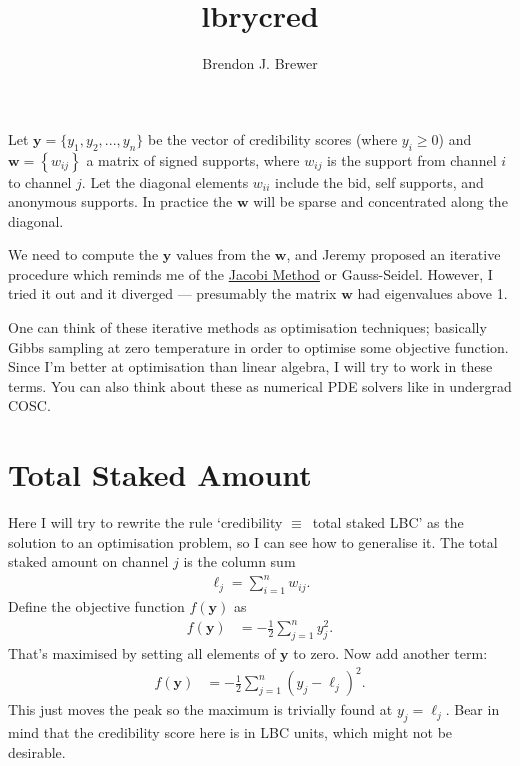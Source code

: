 \documentclass[a4paper, 12pt]{article}
\title{lbrycred}
\author{Brendon J. Brewer}
\date{}
\begin{document}
\maketitle


\setlength{\parindent}{0pt}
\setlength{\parskip}{8pt}

Let $\boldsymbol{y} = \{y_1, y_2, ..., y_n\}$ be the vector of credibility
scores (where $y_i \geq 0$) and $\boldsymbol{w} = \left\{w_{ij}\right\}$
a matrix of signed supports, where
$w_{ij}$ is the support from channel $i$ to channel $j$. Let the diagonal
elements $w_{ii}$ include the bid, self supports, and anonymous supports.
In practice the $\boldsymbol{w}$ will be sparse and concentrated along the
diagonal.

We need to compute the $\boldsymbol{y}$ values from the $\boldsymbol{w}$,
and Jeremy proposed an iterative procedure which reminds me of the
\href{https://en.wikipedia.org/wiki/Jacobi_method}{Jacobi Method} or
Gauss-Seidel. However,
I tried it out and it diverged --- presumably the matrix $\boldsymbol{w}$ had
eigenvalues above 1.

One can think of these iterative methods as optimisation techniques; basically
Gibbs sampling at zero temperature in order to optimise some objective
function. Since I'm better at optimisation than linear algebra, I will try to work in these terms. You can also think about these as numerical PDE solvers
like in undergrad COSC.

\section{Total Staked Amount}
Here I will try to rewrite the rule `credibility $\equiv$~total staked LBC'
as the solution to an optimisation problem, so I can see how to generalise it.
The total staked amount on channel $j$ is the column sum
\begin{align}
\ell_j = \sum_{i=1}^n w_{ij}.
\end{align}
Define the objective function $f(\boldsymbol{y})$ as
\begin{align}
f(\boldsymbol{y}) &= -\frac{1}{2}\sum_{j=1}^n y_j^2.
\end{align}
That's maximised by setting all elements of $\boldsymbol{y}$ to zero.
Now add another term:
\begin{align}
f(\boldsymbol{y}) &= -\frac{1}{2}\sum_{j=1}^n
                            \left(y_j - \ell_j\right)^2.
\end{align}
This just moves the peak so the maximum is trivially found at
$y_j = \ell_j$. Bear in mind that the credibility score here is in LBC
units, which might not be desirable.
\end{document}
